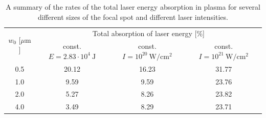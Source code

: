 \begingroup
\renewcommand*{\arraystretch}{1.5}
\begin{table}[b]
	\centering
	\begin{tabular}{c | c | c | c}
		\multirow{2}{*}{$ w_0 $ [$ \mu\mathrm{m} $]} & \multicolumn{3}{c}{Total absorption of laser energy [\%]} \\ \cline{2-4}
		 & const. $ E = 2.83 \cdot 10^{4} \ \mathrm{J} $ & const. $ I = 10^{20} \ \mathrm{W/cm^2} $ & const. $ I = 10^{21} \ \mathrm{W/cm^2} $ \\ \hline \hline
		0.5 & 20.12 & 16.23 & 31.77 \\ \hline
		1.0 & 9.59 & 9.59 & 23.76 \\ \hline
		2.0 & 5.27 & 8.26 & 23.82 \\ \hline
		4.0 & 3.49 & 8.29 & 23.71 \\
	\end{tabular}
	\caption{A summary of the rates of the total laser energy absorption in plasma for several different sizes of the focal spot and different laser intensities.}
	\label{table:2}
\end{table}
\endgroup

